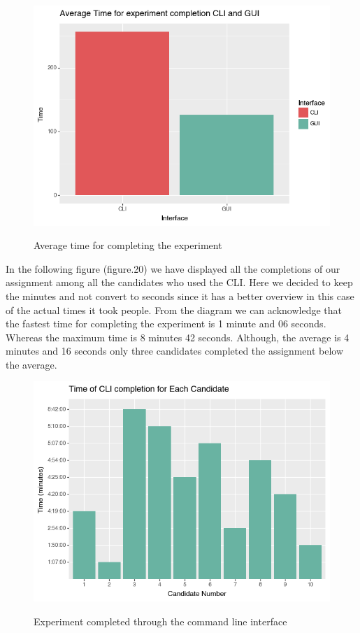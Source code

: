 \documentclass[]{report}
\begin{document}
\begin{figure}[H]
	\centering
	\includegraphics[width=0.75\linewidth]{ExperimentAverageTime}\\
	\caption{Average time for completing the experiment}
	\label{fig: 19}
\end{figure}

In the following figure (figure.20) we have displayed all the completions of our assignment among all the candidates who used the CLI. Here we decided to keep the minutes and not convert to seconds since it has a better overview in this case of the actual times it took people. From the diagram we can acknowledge that the fastest time for completing the experiment is 1 minute and 06 seconds. Whereas the maximum time is 8 minutes 42 seconds. Although, the average is 4 minutes and 16 seconds only three candidates completed the assignment below the average. 

\begin{figure}[H]
	\centering
	\includegraphics[width=0.75\linewidth]{ExperimentCli}\\
	\caption{Experiment completed through the command line interface}
	\label{fig: 20}
\end{figure}
\end{document}
